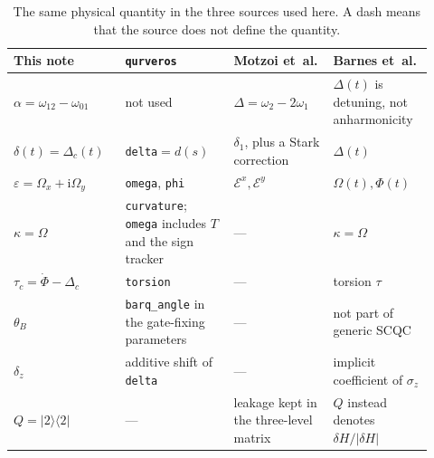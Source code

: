 \documentclass[11pt,a4paper]{article}
\theoremstyle{definition}
\newcommand{\ket}[1]{\lvert #1\rangle}
\newcommand{\bra}[1]{\langle #1\rvert}
\newcommand{\abs}[1]{\lvert #1\rvert}
\newcommand{\ii}{\mathrm{i}}
\newcommand{\eps}{\varepsilon}
\begin{document}
\begin{table}[ht]
\centering
\caption{The same physical quantity in the three sources used here.  A dash
means that the source does not define the quantity.}
\label{tab:notation}
{\small
\begin{tabular}{@{}>{\raggedright\arraybackslash}p{0.24\linewidth}>{\raggedright\arraybackslash}p{0.24\linewidth}>{\raggedright\arraybackslash}p{0.22\linewidth}>{\raggedright\arraybackslash}p{0.22\linewidth}@{}}
\toprule
This note & \texttt{qurveros} & Motzoi et~al. & Barnes et~al. \\
\midrule
\(\alpha=\omega_{12}-\omega_{01}\) &
  not used &
  \(\Delta=\omega_2-2\omega_1\) &
  \(\Delta(t)\) is detuning, not anharmonicity \\
\(\delta(t)=\Delta_c(t)\) &
  \texttt{delta}\({}=d(s)\) &
  \(\delta_1\), plus a Stark correction &
  \(\Delta(t)\) \\
\(\eps=\Omega_x+\ii\Omega_y\) &
  \texttt{omega}, \texttt{phi} &
  \(\mathcal{E}^x,\mathcal{E}^y\) &
  \(\Omega(t),\Phi(t)\) \\
\(\kappa=\Omega\) &
  \texttt{curvature}; \texttt{omega} includes \(T\) and the sign tracker &
  --- &
  \(\kappa=\Omega\) \\
\(\tau_c=\dot\Phi-\Delta_c\) &
  \texttt{torsion} &
  --- &
  torsion \(\tau\) \\
\(\theta_B\) &
  \texttt{barq\_angle} in the gate-fixing parameters &
  --- &
  not part of generic SCQC \\
\(\delta_z\) &
  additive shift of \texttt{delta} &
  --- &
  implicit coefficient of \(\sigma_z\) \\
\(Q=\ket2\bra2\) &
  --- &
  leakage kept in the three-level matrix &
  \(Q\) instead denotes \(\delta H/\abs{\delta H}\) \\
\bottomrule
\end{tabular}}
\end{table}
\end{document}
